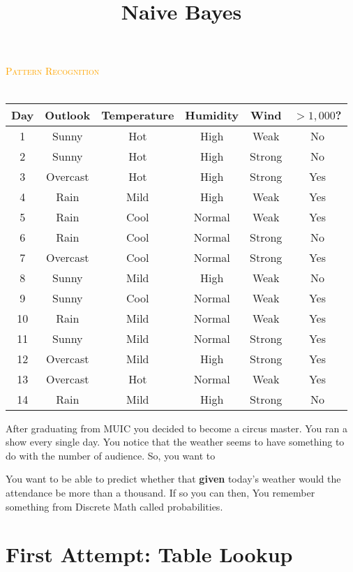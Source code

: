 \documentclass[a4paper, 12pt]{article}
\title{Naive Bayes}
\newcommand{\course}{Pattern Recognition}
\begin{document}
\begin{center}
	\textcolor{orange}{\textsc{\course}}\\
	\huge\textbf{\textsc{\thetitle}}\\
\end{center}

\begin{center}
\begin{tabular}{|c|c|c|c|c|c|}
	\hline Day & Outlook & Temperature & Humidity & Wind & $>1,000$? \\ 
	\hline 1 & Sunny & Hot & High & Weak & No\\ 
	\hline 2 & Sunny & Hot & High & Strong & No \\ 
	\hline 3 & Overcast & Hot & High & Strong & Yes \\ 
	\hline 4 & Rain & Mild & High & Weak & Yes  \\ 
	\hline 5 & Rain & Cool & Normal & Weak & Yes  \\ 
	\hline 6 & Rain & Cool & Normal & Strong & No  \\ 
	\hline 7 & Overcast & Cool & Normal & Strong & Yes  \\ 
	\hline 8 & Sunny & Mild & High & Weak & No \\ 
	\hline 9 & Sunny & Cool & Normal & Weak & Yes  \\ 
	\hline 10 & Rain & Mild  & Normal & Weak & Yes \\ 
	\hline 11 & Sunny & Mild & Normal & Strong & Yes \\ 
	\hline 12 & Overcast & Mild & High & Strong & Yes \\ 
	\hline 13 & Overcast & Hot & Normal  & Weak & Yes  \\ 
	\hline 14 & Rain & Mild & High & Strong & No  \\ 
	\hline 
\end{tabular} 
\end{center}


After graduating from MUIC you decided to become a circus master. You ran a show every single day. You notice that the weather seems to have something to do with the number of audience. So, you want to 

You want to be able to predict whether that \textbf{given} today's weather would the attendance be more than a thousand. If so you can then, You remember something from Discrete Math called probabilities.

\section*{First Attempt: Table Lookup}
\end{document}
